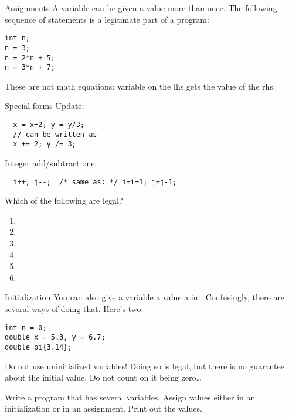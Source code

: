 \begin{block}{Assignments}
  \label{sl:assign2}
  A variable can be given a value more than once. The following
  sequence of statements is a legitimate part of a program:
\begin{lstlisting}
int n;
n = 3;
n = 2*n + 5;
n = 3*n + 7;
\end{lstlisting}
These are not math equations: variable on the lhs gets the value of
the rhs.
\end{block}

\begin{block}{Special forms}
  \label{sl:special-assign}
  Update:
\begin{lstlisting}
  x = x+2; y = y/3;
  // can be written as
  x += 2; y /= 3;
\end{lstlisting}
Integer add/subtract one:
\begin{lstlisting}
  i++; j--;  /* same as: */ i=i+1; j=j-1;
\end{lstlisting}
\end{block}

\begin{exercise}
  \label{q:assign}
  Which of the following are legal?
  \begin{enumerate}
  \item {}
  \item {}
  \item {}
  \item {}
  \item {}
  \item {}
  \end{enumerate}
\end{exercise}

\begin{block}{Initialization}
  \label{sl:init-var}
  You can also give a variable a value a in
  . Confusingly, there are
  several ways of doing that. Here's two:
\begin{lstlisting}
int n = 0;
double x = 5.3, y = 6.7;
double pi{3.14};
\end{lstlisting}
  Do not use uninitialized variables! Doing so is legal, but there is
  no guarantee about the initial value. Do not count on it being zero\ldots
\end{block}

\begin{exercise}
  \label{ex:print-variables}
  Write a program that has several variables. Assign values either in
  an initialization or in an assignment. Print out the values.
\end{exercise}

